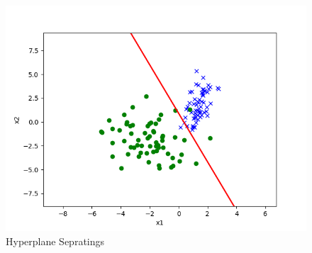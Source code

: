 \begin{answer}
	\begin{figure}[h!]
\centering
  \includegraphics[width=.7\linewidth]{posonly/posonly_true_pred.png}
\caption{Hyperplane Sepratings}
\label{fig:test}
\end{figure}
\end{answer}
